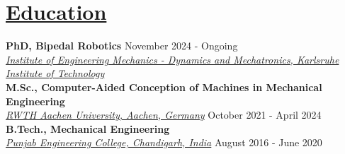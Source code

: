 \section{\underline{Education}}

\large\textbf{PhD, Bipedal Robotics}
\hfill
\large{November 2024 - Ongoing}\\
\href{https://www.itm.kit.edu/dynamik/index.php}{\large{\emph{Institute of Engineering Mechanics - Dynamics and Mechatronics, Karlsruhe Institute of Technology}}}\\

\large\textbf{M.Sc., Computer-Aided Conception of Machines in Mechanical Engineering}
\hfill\mastersgrade\\
\large\href{https://www.rwth-aachen.de/go/id/a/?lidx=1}{\emph{RWTH Aachen University, Aachen, Germany}}
\hfill October 2021 - April 2024\\

\large\textbf{B.Tech., Mechanical Engineering}
\hfill\cgpa\\
\large\href{https://pec.ac.in/}{\emph{Punjab Engineering College, Chandigarh, India}}
\hfill August 2016 - June 2020\\
\vspace{-1.5 em}